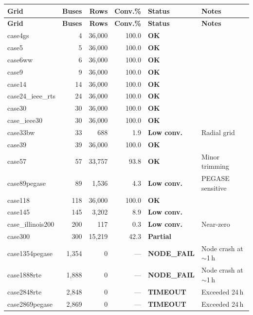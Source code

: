 \documentclass{article}
\newcommand{\statusok}[1]{\textcolor{good}{\textbf{#1}}}
\newcommand{\statuswarn}[1]{\textcolor{warn}{\textbf{#1}}}
\newcommand{\statusbad}[1]{\textcolor{bad}{\textbf{#1}}}
\begin{document}
\begin{longtable}{l r r r l l}
\toprule
\textbf{Grid} & \textbf{Buses} & \textbf{Rows} & \textbf{Conv.\%} & \textbf{Status} & \textbf{Notes} \\
\midrule
\endfirsthead
\toprule
\textbf{Grid} & \textbf{Buses} & \textbf{Rows} & \textbf{Conv.\%} & \textbf{Status} & \textbf{Notes} \\
\midrule
\endhead
case4gs       & 4    & 36{,}000 & 100.0 & \statusok{OK} & \\
case5         & 5    & 36{,}000 & 100.0 & \statusok{OK} & \\
case6ww       & 6    & 36{,}000 & 100.0 & \statusok{OK} & \\
case9         & 9    & 36{,}000 & 100.0 & \statusok{OK} & \\
case14        & 14   & 36{,}000 & 100.0 & \statusok{OK} & \\
case24\_ieee\_rts & 24 & 36{,}000 & 100.0 & \statusok{OK} & \\
case30        & 30   & 36{,}000 & 100.0 & \statusok{OK} & \\
case\_ieee30  & 30   & 36{,}000 & 100.0 & \statusok{OK} & \\
case33bw      & 33   & 688      & 1.9   & \statusbad{Low conv.} & Radial grid \\
case39        & 39   & 36{,}000 & 100.0 & \statusok{OK} & \\
case57        & 57   & 33{,}757 & 93.8  & \statusok{OK} & Minor trimming \\
case89pegase  & 89   & 1{,}536  & 4.3   & \statusbad{Low conv.} & PEGASE sensitive \\
case118       & 118  & 36{,}000 & 100.0 & \statusok{OK} & \\
case145       & 145  & 3{,}202  & 8.9   & \statusbad{Low conv.} & \\
case\_illinois200 & 200 & 117   & 0.3   & \statusbad{Low conv.} & Near-zero \\
case300       & 300  & 15{,}219 & 42.3  & \statuswarn{Partial} & \\
case1354pegase & 1{,}354 & 0   & ---   & \statusbad{NODE\_FAIL} & Node crash at $\sim$1\,h \\
case1888rte   & 1{,}888 & 0    & ---   & \statusbad{NODE\_FAIL} & Node crash at $\sim$1\,h \\
case2848rte   & 2{,}848 & 0    & ---   & \statusbad{TIMEOUT} & Exceeded 24\,h \\
case2869pegase & 2{,}869 & 0   & ---   & \statusbad{TIMEOUT} & Exceeded 24\,h \\

\end{longtable}
\end{document}
